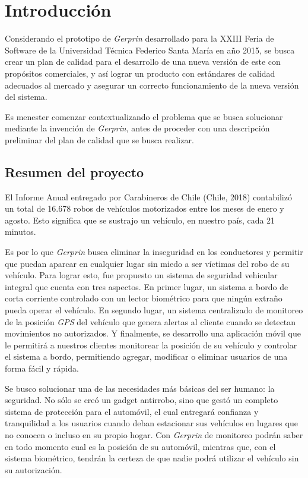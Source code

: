 
\chapter{Introducción}
Considerando el prototipo de \emph{Gerprin} desarrollado para la XXIII Feria de Software de la Universidad Técnica Federico Santa María en año 2015, se busca crear un plan de calidad para el desarrollo de una nueva versión de este con propósitos comerciales, y así lograr un producto con estándares de calidad adecuados al mercado y asegurar un correcto funcionamiento de la nueva versión del sistema.

Es menester comenzar contextualizando el problema que se busca solucionar mediante la invención de \emph{Gerprin}, antes de proceder con una descripción preliminar del plan de calidad que se busca realizar. 

\section{Resumen del proyecto}

El Informe Anual entregado por Carabineros de Chile (Chile, 2018) contabilizó un total de 16.678 robos de vehículos motorizados entre los meses de enero y agosto. Esto significa que se sustrajo un vehículo, en nuestro país, cada 21 minutos.

 Es por lo que \emph{Gerprin} busca eliminar la inseguridad en los conductores y permitir que puedan aparcar en cualquier lugar sin miedo a ser víctimas del robo de su vehículo. Para lograr esto, fue propuesto un sistema de seguridad vehicular integral que cuenta con tres aspectos. En primer lugar, un sistema a bordo de corta corriente controlado con un lector biométrico para que ningún extraño pueda operar el vehículo. En segundo lugar, un sistema centralizado de monitoreo de la posición \emph{GPS} del vehículo que genera alertas al cliente cuando se detectan movimientos no autorizados. Y finalmente, se desarrollo una aplicación móvil que le permitirá a nuestros clientes monitorear la posición de su vehículo y controlar el sistema a bordo, permitiendo agregar, modificar o eliminar usuarios de una forma fácil y rápida.

 Se busco solucionar una de las necesidades más básicas del ser humano: la seguridad. No sólo se creó un gadget antirrobo, sino que gestó un completo sistema de protección para el automóvil, el cual entregará confianza y tranquilidad a los usuarios cuando deban estacionar sus vehículos en lugares que no conocen o incluso en su propio hogar. Con \emph{Gerprin} de monitoreo podrán saber en todo momento cual es la posición de su automóvil, mientras que, con el sistema biométrico, tendrán la certeza de que nadie podrá utilizar el vehículo sin su autorización.

